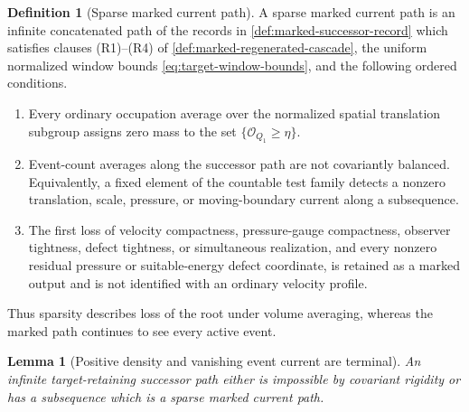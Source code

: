 \documentclass[11pt]{amsart}
\numberwithin{equation}{section}
\theoremstyle{plain}
\newtheorem{lemma}[lemma]{Lemma}
\theoremstyle{definition}
\newtheorem{definition}[definition]{Definition}
\theoremstyle{remark}
\begin{document}
\begin{definition}[Sparse marked current path]
\label{def:sparse-marked-current-path}
A sparse marked current path is an infinite concatenated path of the records
in \cref{def:marked-successor-record} which satisfies clauses
\textup{(R1)}--\textup{(R4)} of
\cref{def:marked-regenerated-cascade}, the uniform normalized window bounds
\eqref{eq:target-window-bounds}, and the following ordered conditions.
\begin{enumerate}[label=\textup{(S\arabic*)},leftmargin=2.8em]
\item Every ordinary occupation average over the normalized spatial
translation subgroup assigns zero mass to the set
\(\{\mathcal O_{Q_1}\ge\eta\}\).
\item Event-count averages along the successor path are not covariantly
balanced.  Equivalently, a fixed element of the countable test family detects
a nonzero translation, scale, pressure, or moving-boundary current along a
subsequence.
\item The first loss of velocity compactness, pressure-gauge compactness,
observer tightness, defect tightness, or simultaneous realization, and every
nonzero residual pressure or suitable-energy defect coordinate, is retained
as a marked output and is not identified with an ordinary velocity profile.
\end{enumerate}
Thus sparsity describes loss of the root under volume averaging, whereas the
marked path continues to see every active event.
\end{definition}

\begin{lemma}[Positive density and vanishing event current are terminal]
\label{lem:density-current-sparse-reduction}
An infinite target-retaining successor path either is impossible by covariant
rigidity or has a subsequence which is a sparse marked current path.
\end{lemma}
\end{document}
